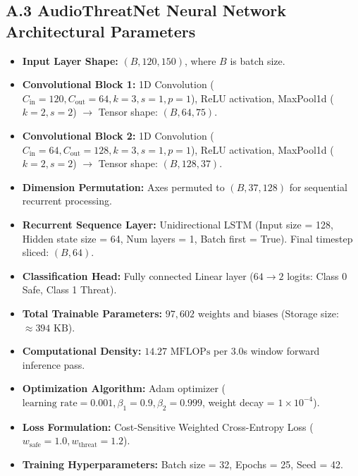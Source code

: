 \documentclass[12pt, a4paper]{report}
\begin{document}
\subsection*{A.3 AudioThreatNet Neural Network Architectural Parameters}
\begin{itemize}
    \item \textbf{Input Layer Shape:} $(B, 120, 150)$, where $B$ is batch size.
    \item \textbf{Convolutional Block 1:} 1D Convolution ($C_{\text{in}}=120, C_{\text{out}}=64, k=3, s=1, p=1$), ReLU activation, MaxPool1d ($k=2, s=2$) $\to$ Tensor shape: $(B, 64, 75)$.
    \item \textbf{Convolutional Block 2:} 1D Convolution ($C_{\text{in}}=64, C_{\text{out}}=128, k=3, s=1, p=1$), ReLU activation, MaxPool1d ($k=2, s=2$) $\to$ Tensor shape: $(B, 128, 37)$.
    \item \textbf{Dimension Permutation:} Axes permuted to $(B, 37, 128)$ for sequential recurrent processing.
    \item \textbf{Recurrent Sequence Layer:} Unidirectional LSTM (Input size = 128, Hidden state size = 64, Num layers = 1, Batch first = True). Final timestep sliced: $(B, 64)$.
    \item \textbf{Classification Head:} Fully connected Linear layer ($64 \to 2$ logits: Class 0 Safe, Class 1 Threat).
    \item \textbf{Total Trainable Parameters:} $97,602\text{ weights and biases}$ (Storage size: $\approx 394\text{ KB}$).
    \item \textbf{Computational Density:} $14.27\text{ MFLOPs}$ per 3.0s window forward inference pass.
    \item \textbf{Optimization Algorithm:} Adam optimizer ($\text{learning rate} = 0.001, \beta_1=0.9, \beta_2=0.999$, weight decay = $1 \times 10^{-4}$).
    \item \textbf{Loss Formulation:} Cost-Sensitive Weighted Cross-Entropy Loss ($w_{\text{safe}}=1.0, w_{\text{threat}}=1.2$).
    \item \textbf{Training Hyperparameters:} Batch size = 32, Epochs = 25, Seed = 42.
\end{itemize}
\end{document}
